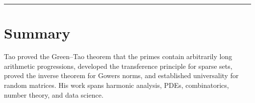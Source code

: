 \begin{center}\rule{0.5\linewidth}{0.5pt}\end{center}

\section*{Summary}

Tao proved the Green--Tao theorem that the primes contain arbitrarily long arithmetic progressions, developed the transference principle for sparse sets, proved the inverse theorem for Gowers norms, and established universality for random matrices. His work spans harmonic analysis, PDEs, combinatorics, number theory, and data science.
